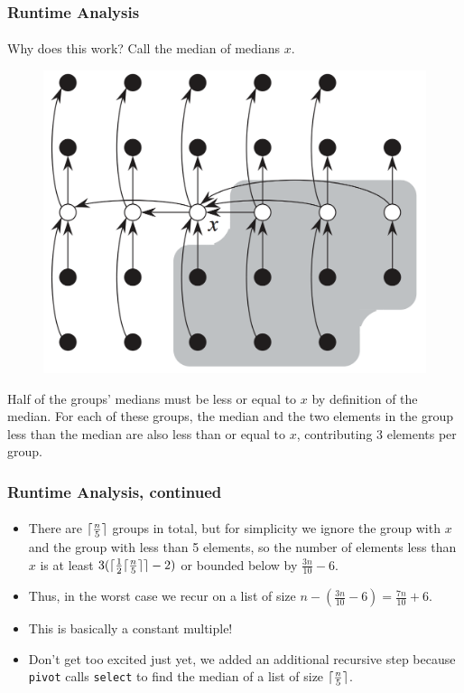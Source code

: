 \documentclass{beamer}                             %
\DeclarePairedDelimiter\ceil{\lceil}{\rceil}
\begin{document}
\begin{frame}
\frametitle{Runtime Analysis}
\framesubtitle{}
Why does this work? Call the median of medians \( x \).

\begin{figure}[h!]
  \centering
  \includegraphics[scale=0.15]{median_of_medians.png}
\end{figure}

Half of the groups' medians must be less or equal to \( x \) by definition
of the median. For each of these groups, the median and the two elements
in the group less than the median are also less than or equal to \( x \),
contributing 3 elements per group.
\end{frame}

\begin{frame}
\frametitle{Runtime Analysis, continued}
\framesubtitle{}
\begin{itemize}[<+->]
  \item There are \( \ceil{\frac{n}{5}} \) groups in total, but
    for simplicity we ignore the group with \( x \) and the group
    with less than 5 elements, so the number of elements less than
    \( x \) is at least \( 3 (\ceil{\frac{1}{2} \ceil{\frac{n}{5}}} - 2) \)
    or bounded below by \( \frac{3n}{10} - 6 \).
  \item Thus, in the worst case we recur on a list of size
    \( n - (\frac{3n}{10} - 6) = \frac{7n}{10} + 6 \).
  \item This is basically a constant multiple!
  \item Don't get too excited just yet, we added an additional
    recursive step because \texttt{pivot} calls \texttt{select} to
    find the median of a list of size \( \ceil{\frac{n}{5}} \).
\end{itemize}
\end{frame}
\end{document}
